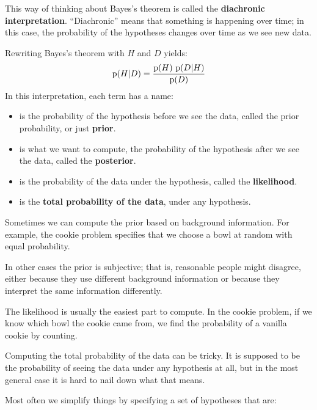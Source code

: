 \documentclass[12pt]{book}
\theoremstyle{exercise}
\begin{document}

This way of thinking about Bayes's theorem is called the
{\bf diachronic interpretation}.  ``Diachronic'' means that something
is happening over time; in this case, the probability of the hypotheses changes over time as we see new data.

Rewriting Bayes's theorem with $H$ and $D$ yields:
%
\[ \mathrm{p}(H|D) = \frac{\mathrm{p}(H)~\mathrm{p}(D|H)}{\mathrm{p}(D)} \]
%
In this interpretation, each term has a name:


\begin{itemize}

\item {} is the probability of the hypothesis before we see
the data, called the prior probability, or just {\bf prior}.

\item {} is what we want to compute, the probability of
the hypothesis after we see the data, called the {\bf posterior}.

\item {} is the probability of the data under the hypothesis,
called the {\bf likelihood}.

\item {} is the {\bf total probability of the data}, under any hypothesis.

\end{itemize}

Sometimes we can compute the prior based on background information.  For example, the cookie problem specifies that we choose a bowl at random with equal probability.

In other cases the prior is subjective; that is, reasonable people
might disagree, either because they use different background
information or because they interpret the same information
differently.


The likelihood is usually the easiest part to compute.  In the
cookie problem, if we know which bowl the cookie came from,
we find the probability of a vanilla cookie by counting.

Computing the total probability of the data can be tricky.  It is supposed to be the probability of seeing the data under any hypothesis at all, but in the most general case it is hard to nail down what that means.

Most often we simplify things by specifying a set of hypotheses
that are:
\end{document}
